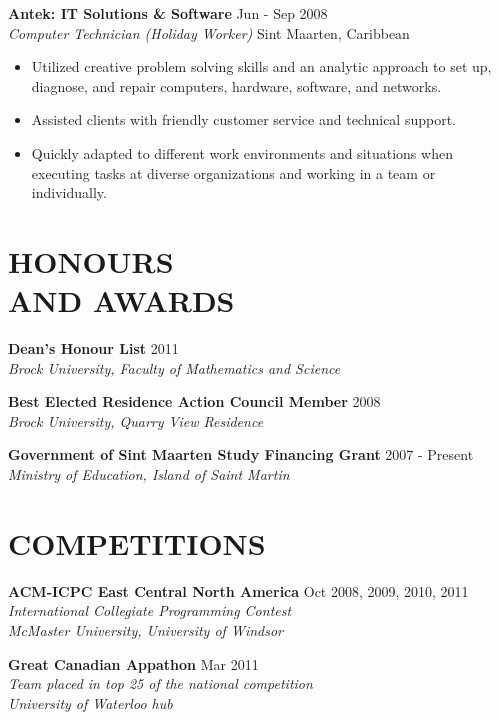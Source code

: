 \documentclass[margin]{res}
\begin{document}
\begin{resume}
	\textbf{Antek: IT Solutions \& Software} \hfill Jun - Sep 2008 \\
    {\sl Computer Technician (Holiday Worker)} \hfill Sint Maarten, Caribbean
	\begin{itemize}  \itemsep -2pt %
	  \item Utilized creative problem solving skills and an analytic approach to set up, diagnose,
	  and repair computers, hardware, software, and networks.
	  \item Assisted clients with friendly customer service and technical support.
	  \item Quickly adapted to different work environments and situations when executing tasks at
	  diverse organizations and working in a team or individually.
	\end{itemize}

\vfill

\section{HONOURS \\ AND AWARDS}

  \textbf{Dean's Honour List} \hfill 2011 \\
    {\sl Brock University, Faculty of Mathematics and Science}

  \textbf{Best Elected Residence Action Council Member} \hfill 2008 \\
    {\sl Brock University, Quarry View Residence}

  \textbf{Government of Sint Maarten Study Financing Grant} \hfill 2007 - Present \\
    {\sl Ministry of Education, Island of Saint Martin}
 
\section{COMPETITIONS}

  \textbf{ACM-ICPC East Central North America} \hfill Oct 2008, 2009, 2010, 2011 \\
    {\sl International Collegiate Programming Contest} \\
    {\sl McMaster University, University of Windsor} %

  \textbf{Great Canadian Appathon} \hfill Mar 2011 \\
    {\sl Team placed in top 25 of the national competition} \\
    {\sl University of Waterloo hub}


\end{resume}
\end{document}
